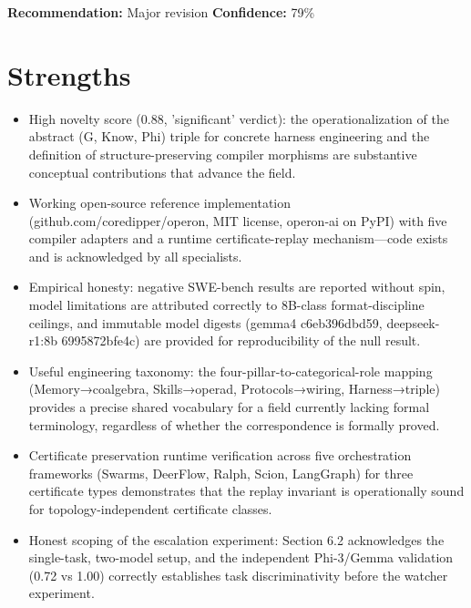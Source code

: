 \documentclass[11pt]{article}
\begin{document}
\textbf{Recommendation:} Major revision \quad \textbf{Confidence:} 79\%\\

\section*{Strengths}
\begin{itemize}[leftmargin=*]
  \item High novelty score (0.88, 'significant' verdict): the operationalization of the abstract (G, Know, Phi) triple for concrete harness engineering and the definition of structure-preserving compiler morphisms are substantive conceptual contributions that advance the field.
  \item Working open-source reference implementation (github.com/coredipper/operon, MIT license, operon-ai on PyPI) with five compiler adapters and a runtime certificate-replay mechanism—code exists and is acknowledged by all specialists.
  \item Empirical honesty: negative SWE-bench results are reported without spin, model limitations are attributed correctly to 8B-class format-discipline ceilings, and immutable model digests (gemma4 c6eb396dbd59, deepseek-r1:8b 6995872bfe4c) are provided for reproducibility of the null result.
  \item Useful engineering taxonomy: the four-pillar-to-categorical-role mapping (Memory→coalgebra, Skills→operad, Protocols→wiring, Harness→triple) provides a precise shared vocabulary for a field currently lacking formal terminology, regardless of whether the correspondence is formally proved.
  \item Certificate preservation runtime verification across five orchestration frameworks (Swarms, DeerFlow, Ralph, Scion, LangGraph) for three certificate types demonstrates that the replay invariant is operationally sound for topology-independent certificate classes.
  \item Honest scoping of the escalation experiment: Section 6.2 acknowledges the single-task, two-model setup, and the independent Phi-3/Gemma validation (0.72 vs 1.00) correctly establishes task discriminativity before the watcher experiment.
\end{itemize}
\end{document}
